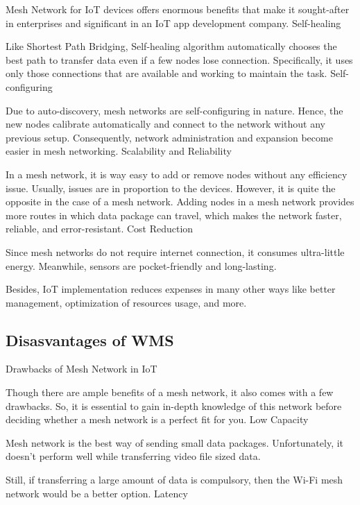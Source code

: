 			Mesh Network for IoT devices offers enormous benefits that make it sought-after in enterprises and significant in an IoT app development company.
			Self-healing
			
			Like Shortest Path Bridging, Self-healing algorithm automatically chooses the best path to transfer data even if a few nodes lose connection. Specifically, it uses only those connections that are available and working to maintain the task.
			Self-configuring
			
			Due to auto-discovery, mesh networks are self-configuring in nature. Hence, the new nodes calibrate automatically and connect to the network without any previous setup. Consequently, network administration and expansion become easier in mesh networking.
			Scalability and Reliability
			
			In a mesh network, it is way easy to add or remove nodes without any efficiency issue. Usually, issues are in proportion to the devices. However, it is quite the opposite in the case of a mesh network. Adding nodes in a mesh network provides more routes in which data package can travel, which makes the network faster, reliable, and error-resistant.
			Cost Reduction
			
			Since mesh networks do not require internet connection, it consumes ultra-little energy. Meanwhile, sensors are pocket-friendly and long-lasting.
			
			Besides, IoT implementation reduces expenses in many other ways like better management, optimization of resources usage, and more.
		
		\subsection{Disasvantages of WMS}
		
			Drawbacks of Mesh Network in IoT
			
			Though there are ample benefits of a mesh network, it also comes with a few drawbacks. So, it is essential to gain in-depth knowledge of this network before deciding whether a mesh network is a perfect fit for you.
			Low Capacity
			
			Mesh network is the best way of sending small data packages. Unfortunately, it doesn’t perform well while transferring video file sized data.
			
			Still, if transferring a large amount of data is compulsory, then the Wi-Fi mesh network would be a better option.
			Latency
			
